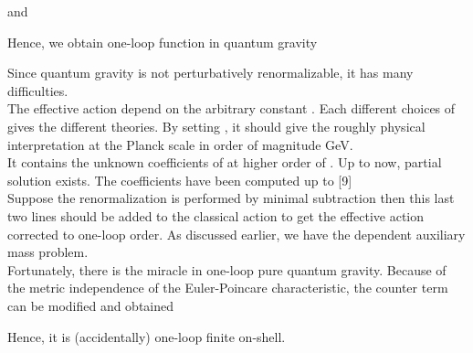 \documentclass[a4paper,12 pt]{article}
\begin{document}
and
\begin{center}
\coordHE{}
\end{center}
Hence, we obtain one-loop \coordHE{} function in quantum gravity
\begin{center}
\coordHE{}
\end{center}

Since quantum gravity is not perturbatively renormalizable, it has many difficulties. \\
\coordHE{} The effective action depend on the arbitrary constant \myHighlight{$\mu$}\coordHE{}.
Each different choices of \myHighlight{$\mu$}\coordHE{} gives the different theories. By
setting \coordHE{}, it should give the roughly physical
interpretation at the Planck scale in order of magnitude
\coordHE{} GeV. \\
\coordHE{} It contains the unknown coefficients of \coordHE{} at higher
order of \coordHE{}. Up to now, partial solution exists. The coefficients
have been computed up to \coordHE{}[9] \\
\coordHE{} Suppose the renormalization is performed by minimal
subtraction then this last two lines should be added to the
classical action to get the effective action corrected to one-loop
order. As discussed earlier, we have the dependent auxiliary mass
problem.\\
Fortunately, there is the miracle in one-loop pure quantum
gravity. Because of the metric independence of the Euler-Poincare
characteristic, the counter term can be modified and obtained

\begin{center}
\coordHE{}
\end{center}
Hence, it is (accidentally) one-loop finite on-shell.\\
\end{document}
